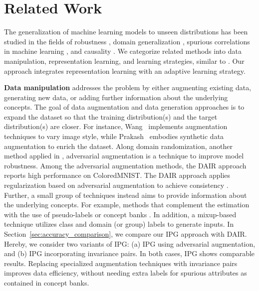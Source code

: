 \section{Related Work}
\label{sec:related_work}
%
The generalization of machine learning models to unseen distributions has been studied in the fields of robustness \cite{sagawa_distributionally_2020}, domain generalization \cite{wang_generalizing_2023}, spurious correlations in machine learning \cite{ye_spurious_2024, steinmann_navigating_2024}, and causality \cite{ye_spurious_2024}.
We categorize related methods into data manipulation, representation learning, and learning strategies, similar to \cite{wang_generalizing_2023, ye_spurious_2024}.
Our approach integrates representation learning with an adaptive learning strategy.

\textbf{Data manipulation} addresses the problem by either augmenting existing data, generating new data, or adding further information about the underlying concepts. 
The goal of data augmentation and data generation approaches is to expand the dataset so that the training distribution(s) and the target distribution(s) are closer.
For instance, Wang~\cite{wang_learning_2021} implements augmentation techniques to vary image style, while Prakash~\cite{prakash_structured_2019} embodies synthetic data augmentation to enrich the dataset.
Along domain randomization, another method applied in \cite{yue_domain_2019, prakash_structured_2019}, adversarial augmentation \cite{huang_robustness_2023, von_kugelgen_self-supervised_2021, puli_nuisances_2024} is a technique to improve model robustness.
%
Among the adversarial augmentation methods, the DAIR approach reports high performance on ColoredMNIST.
The DAIR approach applies regularization based on adversarial augmentation to achieve consistency \cite{huang_robustness_2023}.
%
Further, a small group of techniques instead aims to provide information about the underlying concepts. 
For example, methods that complement the estimation with the use of pseudo-labels \cite{nam_spread_2022, srivastava_robustness_2020} or concept banks \cite{wu_discover_2023, koh_concept_2020}.
In addition, a mixup-based technique \cite{yao_improving_2022} utilizes class and domain (or group) labels to generate inputs. 
%
In Section~\ref{sec:accuracy_comparison}, we compare our IPG approach with DAIR. Hereby, we consider two variants of IPG: (a) IPG using adversarial augmentation, and (b) IPG incorporating invariance pairs. 
In both cases, IPG shows comparable results. 
Replacing specialized augmentation techniques with invariance pairs improves data efficiency, without needing extra labels for spurious attributes as contained in concept banks.


